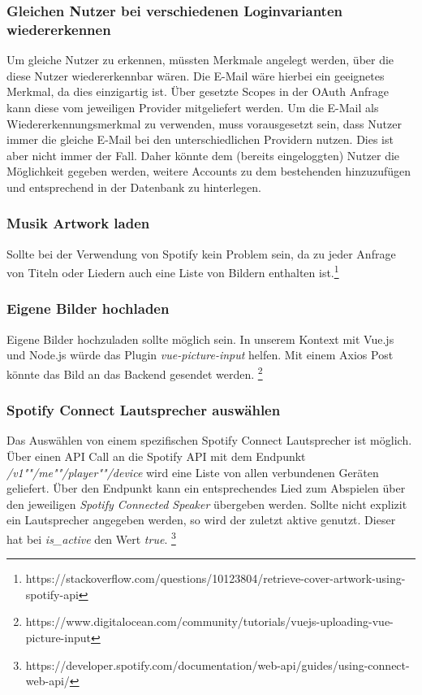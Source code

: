 \documentclass[10pt, a4paper]{article}
\begin{document}
\subsubsection{Gleichen Nutzer bei verschiedenen Loginvarianten wiedererkennen}
Um gleiche Nutzer zu erkennen, müssten Merkmale angelegt werden, über die diese Nutzer wiedererkennbar wären.
Die E-Mail wäre hierbei ein geeignetes Merkmal, da dies einzigartig ist. Über gesetzte Scopes in der OAuth Anfrage kann diese vom jeweiligen Provider mitgeliefert werden.
Um die E-Mail als Wiedererkennungsmerkmal zu verwenden, muss vorausgesetzt sein, dass Nutzer immer die gleiche E-Mail bei den unterschiedlichen Providern nutzen. Dies ist aber nicht immer der Fall.
Daher könnte dem (bereits eingeloggten) Nutzer die Möglichkeit gegeben werden, weitere Accounts zu dem bestehenden hinzuzufügen und entsprechend in der Datenbank zu hinterlegen.

\subsubsection{Musik Artwork laden}
Sollte bei der Verwendung von Spotify kein Problem sein, da zu jeder Anfrage von Titeln oder Liedern auch eine Liste von Bildern enthalten ist.\footnote{https://stackoverflow.com/questions/10123804/retrieve-cover-artwork-using-spotify-api}

\subsubsection{Eigene Bilder hochladen}
Eigene Bilder hochzuladen sollte möglich sein. In unserem Kontext mit Vue.js und Node.js würde das Plugin \textit{vue-picture-input} helfen.
Mit einem Axios Post könnte das Bild an das Backend gesendet werden. \footnote{https://www.digitalocean.com/community/tutorials/vuejs-uploading-vue-picture-input}

\subsubsection{Spotify Connect Lautsprecher auswählen}
Das Auswählen von einem spezifischen Spotify Connect Lautsprecher ist möglich.
Über einen API Call an die Spotify API mit dem Endpunkt \textit{/v1""/me""/player""/device} wird eine Liste von allen verbundenen Geräten geliefert. Über den Endpunkt kann ein entsprechendes Lied zum Abspielen über den jeweiligen \textit{Spotify Connected Speaker} übergeben werden.
Sollte nicht explizit ein Lautsprecher angegeben werden, so wird der zuletzt aktive genutzt. Dieser hat bei \textit{is\_active} den Wert \textit{true}. \footnote{https://developer.spotify.com/documentation/web-api/guides/using-connect-web-api/}
\end{document}
